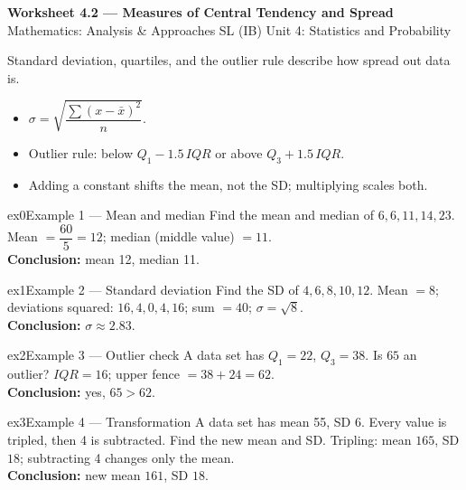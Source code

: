 \documentclass[11pt]{article}
\begin{document}
\begin{center}
{\LARGE\bfseries\color{titleblue}Worksheet 4.2 --- Measures of Central Tendency and Spread}\\[2pt]
{\small Mathematics: Analysis \& Approaches SL (IB) \textperiodcentered{} Unit 4: Statistics and Probability}
\end{center}

\begin{ideabox}
Standard deviation, quartiles, and the outlier rule describe how spread out data is.
\begin{itemize}[leftmargin=*,itemsep=2pt]
  \item $\sigma=\sqrt{\dfrac{\sum(x-\bar x)^2}{n}}$.
  \item Outlier rule: below $Q_1-1.5\,IQR$ or above $Q_3+1.5\,IQR$.
  \item Adding a constant shifts the mean, not the SD; multiplying scales both.
\end{itemize}
\end{ideabox}


\begin{example}{ex0}{Example 1 --- Mean and median}
Find the mean and median of $6,6,11,14,23$.\soln
Mean $=\dfrac{60}{5}=12$; median (middle value) $=11$.\\[3pt]\textbf{Conclusion:} mean 12, median 11.
\end{example}

\begin{example}{ex1}{Example 2 --- Standard deviation}
Find the SD of $4,6,8,10,12$.\soln
Mean $=8$; deviations squared: $16,4,0,4,16$; sum $=40$; $\sigma=\sqrt{8}$.\\[3pt]\textbf{Conclusion:} $\sigma\approx2.83$.
\end{example}

\begin{example}{ex2}{Example 3 --- Outlier check}
A data set has $Q_1=22$, $Q_3=38$. Is $65$ an outlier?\soln
$IQR=16$; upper fence $=38+24=62$.\\[3pt]\textbf{Conclusion:} yes, $65>62$.
\end{example}

\begin{example}{ex3}{Example 4 --- Transformation}
A data set has mean 55, SD 6. Every value is tripled, then 4 is subtracted. Find the new mean and SD.\soln
Tripling: mean $165$, SD $18$; subtracting 4 changes only the mean.\\[3pt]\textbf{Conclusion:} new mean $161$, SD $18$.
\end{example}
\end{document}
